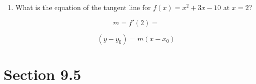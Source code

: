 \documentclass[14pt]{extarticle}
\begin{document}
\begin{enumerate}
	
	\item What is the equation of the tangent line for $f(x) = x^2 + 3x - 10$ at $x = 2$?
	\begin{fleqn}\begin{equation*}m = f'(2) =\end{equation*} \end{fleqn}
	\vspace{1cm}
	\begin{fleqn}\begin{equation*}(y-y_0) = m(x-x_0) \end{equation*} \end{fleqn}
	\vspace{.5cm}
	
\end{enumerate}

\section{Section 9.5}
\end{document}

